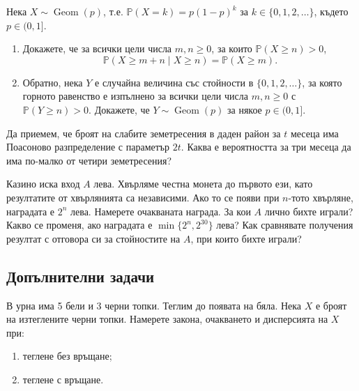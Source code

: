 \documentclass[11pt,a4paper]{article}
\newenvironment{enumeratea}{\begin{enumerate}[label=(\alph*),itemsep=0.28em,topsep=0.25em]}{\end{enumerate}}
\newcommand{\Pbb}{\mathbb P}
\newcommand{\Geom}{\operatorname{Geom}}
\newcounter{problem}[section]
\begin{document}
\begin{problempencil}
Нека $X\sim\Geom(p)$, т.е. $\Pbb(X=k)=p(1-p)^k$ за $k\in\{0,1,2,\dots\}$, където
$p\in(0,1]$.
\begin{enumeratea}
  \item Докажете, че за всички цели числа $m,n\ge0$, за които $\Pbb(X\ge n)>0$,
  \[
  \Pbb(X\ge m+n\mid X\ge n)=\Pbb(X\ge m).
  \]
  \item Обратно, нека $Y$ е случайна величина със стойности в
  $\{0,1,2,\dots\}$, за която горното равенство е изпълнено за всички
  цели числа $m,n\ge0$ с $\Pbb(Y\ge n)>0$. Докажете, че $Y\sim\Geom(p)$ за някое
  $p\in(0,1]$.
\end{enumeratea}
\end{problempencil}

\begin{problembook}
Да приемем, че броят на слабите земетресения в даден район за $t$ месеца
има Поасоново разпределение с параметър $2t$. Каква е вероятността за три
месеца да има по-малко от четири земетресения?
\end{problembook}

\begin{probleminteresting}
Казино иска вход $A$ лева. Хвърляме честна монета до първото ези, като
резултатите от хвърлянията са независими. Ако то се появи при $n$-тото
хвърляне, наградата е $2^n$ лева. Намерете очакваната
награда. За кои $A$ лично бихте играли? Какво се променя, ако наградата е
$\min\{2^n,2^{30}\}$ лева? Как сравнявате получения
резултат с отговора си за стойностите на $A$, при които бихте играли?
\end{probleminteresting}

\subsection*{Допълнителни задачи}

\begin{problem}
В урна има 5 бели и 3 черни топки. Теглим до появата на бяла. Нека $X$ е
броят на изтеглените черни топки. Намерете закона, очакването и дисперсията
на $X$ при:
\begin{enumeratea}
  \item теглене без връщане;
  \item теглене с връщане.
\end{enumeratea}
\end{problem}
\end{document}
